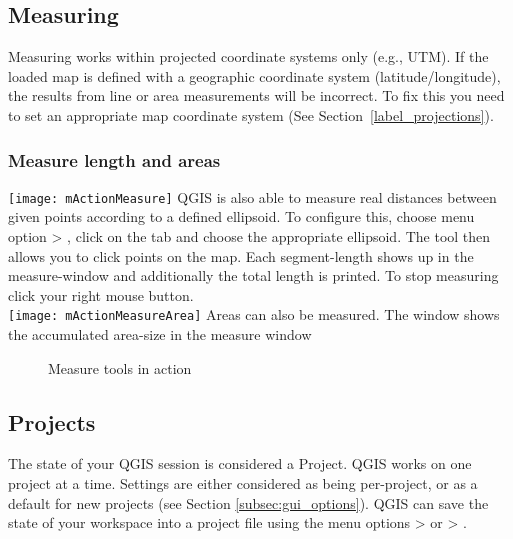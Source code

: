 \subsection{Measuring}\label{sec:measure}

Measuring works within projected coordinate systems only (e.g., UTM). If 
the loaded map is defined with a geographic coordinate system
(latitude/longitude), the results from line or area measurements will be 
incorrect. To fix this you need to set an appropriate map coordinate system 
(See Section~\ref{label_projections}).

\subsubsection{Measure length and areas}
\texttt{[image: mActionMeasure]} 
QGIS is also able to measure real distances between given 
points according to a defined ellipsoid. To configure this, choose menu option 
 > , 
click on the  tab and choose the appropriate ellipsoid. The tool then allows you to 
click points on the map. Each segment-length shows up in the measure-window and additionally the total 
length is printed. To stop measuring click your right mouse button. \\
\texttt{[image: mActionMeasureArea]} Areas can also be measured. 
The window shows the accumulated area-size in the measure window 

\begin{figure}[h]
\caption{Measure tools in action \nixcaption} \label{fig:measure}
\centering
   \goodgap
\end{figure}

\subsection{Projects}\label{sec:projects}

The state of your QGIS session is considered a Project.  QGIS
works on one project at a time.  Settings are either considered
as being per-project, or as a default for new projects (see
Section \ref{subsec:gui_options}). QGIS can save the state of your 
workspace into a project file using the menu options 
 > 
or  > .

